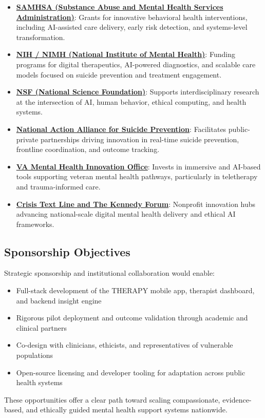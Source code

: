 \begin{itemize}
  \item \textbf{\href{https://www.samhsa.gov/grants}{SAMHSA (Substance Abuse and Mental Health Services Administration)}}\autocite{samhsa_grants}: Grants for innovative behavioral health interventions, including AI-assisted care delivery, early risk detection, and systems-level transformation.

  \item \textbf{\href{https://www.nimh.nih.gov/funding}{NIH / NIMH (National Institute of Mental Health)}}\autocite{nimh_funding}: Funding programs for digital therapeutics, AI-powered diagnostics, and scalable care models focused on suicide prevention and treatment engagement.

  \item \textbf{\href{https://www.nsf.gov/funding/opportunities}{NSF (National Science Foundation)}}\autocite{nsf_funding}: Supports interdisciplinary research at the intersection of AI, human behavior, ethical computing, and health systems.

  \item \textbf{\href{https://theactionalliance.org}{National Action Alliance for Suicide Prevention}}\autocite{action_alliance}: Facilitates public-private partnerships driving innovation in real-time suicide prevention, frontline coordination, and outcome tracking.

  \item \textbf{\href{https://www.innovation.va.gov/hil/views/immersive/immersive-programs.html}{VA Mental Health Innovation Office}}\autocite{va_innovation}: Invests in immersive and AI-based tools supporting veteran mental health pathways, particularly in teletherapy and trauma-informed care.

  \item \textbf{\href{https://www.crisistextline.org}{Crisis Text Line and The Kennedy Forum}}\autocite{crisis_kennedy}: Nonprofit innovation hubs advancing national-scale digital mental health delivery and ethical AI frameworks.
\end{itemize}

\subsection*{Sponsorship Objectives}

Strategic sponsorship and institutional collaboration would enable:

\begin{itemize}
  \item Full-stack development of the THERAPY mobile app, therapist dashboard, and backend insight engine
  \item Rigorous pilot deployment and outcome validation through academic and clinical partners
  \item Co-design with clinicians, ethicists, and representatives of vulnerable populations
  \item Open-source licensing and developer tooling for adaptation across public health systems
\end{itemize}

These opportunities offer a clear path toward scaling compassionate, evidence-based, and ethically guided mental health support systems nationwide.
